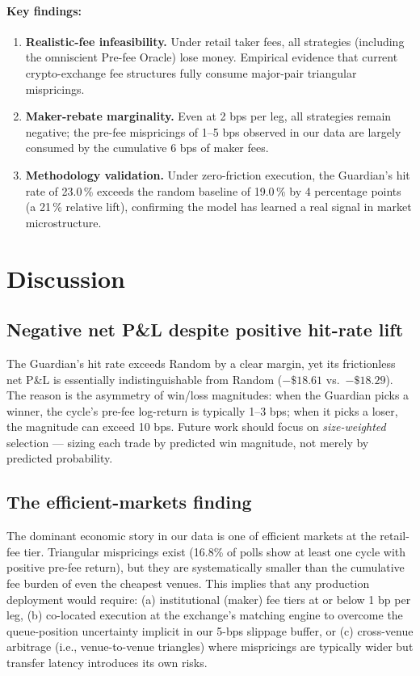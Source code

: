 \documentclass[11pt,a4paper]{article}
\begin{document}
\paragraph{Key findings:}
\begin{enumerate}[label=(\roman*)]
    \item \textbf{Realistic-fee infeasibility.} Under retail taker fees, all strategies (including the omniscient Pre-fee Oracle) lose money. Empirical evidence that current crypto-exchange fee structures fully consume major-pair triangular mispricings.
    \item \textbf{Maker-rebate marginality.} Even at 2 bps per leg, all strategies remain negative; the pre-fee mispricings of 1--5 bps observed in our data are largely consumed by the cumulative 6 bps of maker fees.
    \item \textbf{Methodology validation.} Under zero-friction execution, the Guardian's hit rate of 23.0\,\% exceeds the random baseline of 19.0\,\% by 4 percentage points (a 21\,\% relative lift), confirming the model has learned a real signal in market microstructure.
\end{enumerate}

\section{Discussion}
\label{sec:discussion}

\subsection{Negative net P\&L despite positive hit-rate lift}
The Guardian's hit rate exceeds Random by a clear margin, yet its frictionless net P\&L is essentially indistinguishable from Random ($-\$18.61$ vs.\ $-\$18.29$). The reason is the asymmetry of win/loss magnitudes: when the Guardian picks a winner, the cycle's pre-fee log-return is typically 1--3 bps; when it picks a loser, the magnitude can exceed 10 bps. Future work should focus on \emph{size-weighted} selection --- sizing each trade by predicted win magnitude, not merely by predicted probability.

\subsection{The efficient-markets finding}
The dominant economic story in our data is one of efficient markets at the retail-fee tier. Triangular mispricings exist (16.8\% of polls show at least one cycle with positive pre-fee return), but they are systematically smaller than the cumulative fee burden of even the cheapest venues. This implies that any production deployment would require: (a) institutional (maker) fee tiers at or below 1 bp per leg, (b) co-located execution at the exchange's matching engine to overcome the queue-position uncertainty implicit in our 5-bps slippage buffer, or (c) cross-venue arbitrage (i.e., venue-to-venue triangles) where mispricings are typically wider but transfer latency introduces its own risks.
\end{document}
